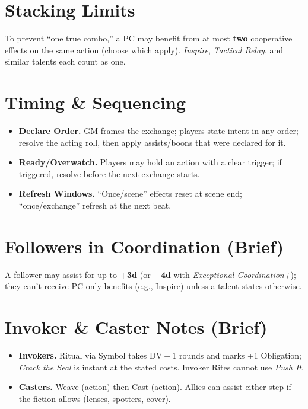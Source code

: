 \section{Stacking Limits}
\label{sec:stacking}
\noindent To prevent “one true combo,” a PC may benefit from at most \textbf{two} cooperative effects on the same action (choose which apply). \emph{Inspire}, \emph{Tactical Relay}, and similar talents each count as one.

\section{Timing \& Sequencing}
\label{sec:timing}
\begin{itemize}
  \item \textbf{Declare Order.} GM frames the exchange; players state intent in any order; resolve the acting roll, then apply assists/boons that were declared for it.
  \item \textbf{Ready/Overwatch.} Players may hold an action with a clear trigger; if triggered, resolve before the next exchange starts.
  \item \textbf{Refresh Windows.} “Once/scene” effects reset at scene end; “once/exchange” refresh at the next beat.
\end{itemize}

\section{Followers in Coordination (Brief)}
\label{sec:followers-coord}
\noindent A follower may assist for up to \textbf{+3d} (or \textbf{+4d} with \emph{Exceptional Coordination+}); they can’t receive PC-only benefits (e.g., Inspire) unless a talent states otherwise.

\section{Invoker \& Caster Notes (Brief)}
\begin{itemize}
  \item \textbf{Invokers.} Ritual via Symbol takes \(\text{DV}+1\) rounds and marks +1 Obligation; \emph{Crack the Seal} is instant at the stated costs. Invoker Rites cannot use \emph{Push It}.
  \item \textbf{Casters.} Weave (action) then Cast (action). Allies can assist either step if the fiction allows (lenses, spotters, cover).
\end{itemize}

